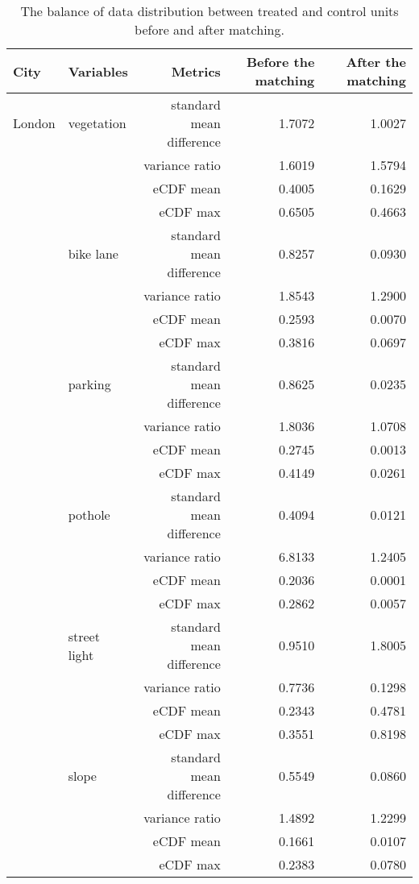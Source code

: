 \begin{table}[!htp]\centering
\caption{The balance of data distribution between treated and control units before and after matching.}\label{result:tab:match_result}
\scriptsize
\begin{tabular}{llrrr}\toprule
City&Variables&Metrics&Before the matching &After the matching \\\midrule

London & vegetation & standard mean difference & 1.7072 & \cellcolor{customgreen} 1.0027 \\
 &  & variance ratio & 1.6019 & \cellcolor{customgreen} 1.5794 \\
 &  & eCDF mean & 0.4005 & \cellcolor{customgreen} 0.1629 \\
 &  & eCDF max & 0.6505 & \cellcolor{customgreen} 0.4663 \\
 & bike lane & standard mean difference & 0.8257 & \cellcolor{customgreen} 0.0930 \\
 &  & variance ratio & 1.8543 & \cellcolor{customgreen} 1.2900 \\
 &  & eCDF mean & 0.2593 & \cellcolor{customgreen} 0.0070 \\
 &  & eCDF max & 0.3816 & \cellcolor{customgreen} 0.0697 \\
 & parking & standard mean difference & 0.8625 & \cellcolor{customgreen} 0.0235 \\
 &  & variance ratio & 1.8036 & \cellcolor{customgreen} 1.0708 \\
 &  & eCDF mean & 0.2745 & \cellcolor{customgreen} 0.0013 \\
 &  & eCDF max & 0.4149 & \cellcolor{customgreen} 0.0261 \\
 & pothole & standard mean difference & 0.4094 & \cellcolor{customgreen} 0.0121 \\
 &  & variance ratio & 6.8133 & \cellcolor{customgreen} 1.2405 \\
 &  & eCDF mean & 0.2036 & \cellcolor{customgreen} 0.0001 \\
 &  & eCDF max & 0.2862 & \cellcolor{customgreen} 0.0057 \\
 & street light & standard mean difference & 0.9510 & \cellcolor{custompurple} 1.8005 \\
 &  & variance ratio & 0.7736 & \cellcolor{custompurple} 0.1298 \\
 &  & eCDF mean & 0.2343 & \cellcolor{custompurple} 0.4781 \\
 &  & eCDF max & 0.3551 & \cellcolor{custompurple} 0.8198 \\
 & slope & standard mean difference & 0.5549 & \cellcolor{customgreen} 0.0860 \\
 &  & variance ratio & 1.4892 & \cellcolor{customgreen} 1.2299 \\
 &  & eCDF mean & 0.1661 & \cellcolor{customgreen} 0.0107 \\
 &  & eCDF max & 0.2383 & \cellcolor{customgreen} 0.0780 \\
\bottomrule
\end{tabular}
\end{table}

